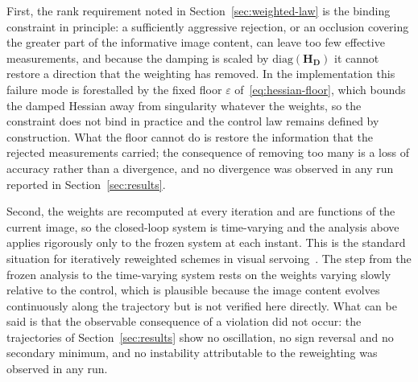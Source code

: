 First, the rank requirement noted in Section~\ref{sec:weighted-law} is the
binding constraint in principle: a sufficiently aggressive rejection, or an
occlusion covering the greater part of the informative image content, can
leave too few effective measurements, and because the damping is scaled by
$\mathrm{diag}(\mathbf{H}_{\mathbf{D}})$ it cannot restore a direction that
the weighting has removed. In the implementation this failure mode is
forestalled by the fixed floor $\varepsilon$ of~\eqref{eq:hessian-floor},
which bounds the damped Hessian away from singularity whatever the weights,
so the constraint does not bind in practice and the control law remains
defined by construction. What the floor cannot do is restore the information
that the rejected measurements carried; the consequence of removing too many
is a loss of accuracy rather than a divergence, and no divergence was observed
in any run reported in Section~\ref{sec:results}.

Second, the weights are recomputed at every iteration and are functions of the
current image, so the closed-loop system is time-varying and the analysis
above applies rigorously only to the frozen system at each instant. This is
the standard situation for iteratively reweighted schemes in visual
servoing~\cite{key26}. The step from the frozen analysis to the time-varying
system rests on the weights varying slowly relative to the control, which is
plausible because the image content evolves continuously along the trajectory
but is not verified here directly. What can be said is that the observable
consequence of a violation did not occur: the trajectories of
Section~\ref{sec:results} show no oscillation, no sign reversal and no
secondary minimum, and no instability attributable to the reweighting was
observed in any run.

